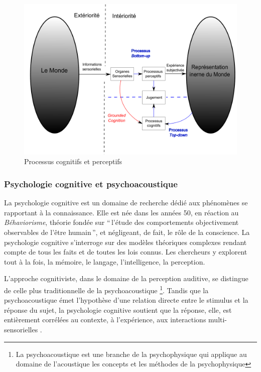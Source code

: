 \begin{figure}[bth]
        \myfloatalign
        \includegraphics[width=.8\linewidth]{gfx/Representation}
        \caption{Processus cognitifs et perceptifs}\label{fig:processusPercepAndCo}
\end{figure}

\subsubsection{Psychologie cognitive et psychoacoustique}

La psychologie cognitive est un domaine de recherche dédié aux phénomènes se rapportant à la connaissance. Elle est née dans les années 50, en réaction au \emph{Béhaviorisme}, théorie fondée sur ``\,l'étude des comportements objectivement observables de l'être humain\,'', et négligeant, de fait, le rôle de la conscience. La psychologie cognitive s'interroge sur des modèles théoriques complexes rendant compte de tous les faits et de toutes les lois connus. Les chercheurs y explorent tout à la fois, la mémoire, le langage, l'intelligence, la perception.
 
L'approche cognitiviste, dans le domaine de la perception auditive, se distingue de celle plus traditionnelle de la psychoacoustique \footnote{La psychoacoustique est une branche de la psychophysique qui applique au domaine de l'acoustique les concepts et les méthodes de la psychophysique}. Tandis que la psychoacoustique émet l'hypothèse d'une relation directe entre le stimulus et la réponse du sujet, la psychologie cognitive soutient que la réponse, elle, est entièrement corrélées au contexte, à l'expérience, aux interactions multi-sensorielles \citep{maffiolo_marieParis_1997}.


